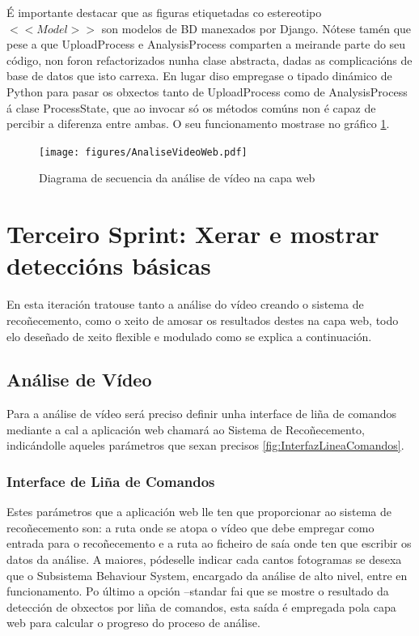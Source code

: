         É importante destacar que as figuras etiquetadas co estereotipo $<<Model>>$ son modelos 
        de BD manexados por Django. Nótese tamén que pese a que UploadProcess e AnalysisProcess
        comparten a meirande parte do seu código, non foron refactorizados nunha clase abstracta,
        dadas as complicacións de base de datos que isto carrexa. En lugar diso empregase o 
        tipado dinámico de Python para pasar os obxectos tanto de UploadProcess como de 
        AnalysisProcess á clase ProcessState, que ao invocar só os métodos comúns non é capaz de 
        percibir a diferenza entre ambas. O seu funcionamento mostrase no gráfico
        \ref{fig:AnaliseVideoWeb}.
        
        \begin{figure}[htp]
        \begin{center}
            \texttt{[image: figures/AnaliseVideoWeb.pdf]}
            \caption{Diagrama de secuencia da análise de vídeo na capa web}
        \label{fig:AnaliseVideoWeb}
        \end{center}
        \end{figure}
    
\section{Terceiro Sprint: Xerar e mostrar deteccións básicas}

    En esta iteración tratouse tanto a análise do vídeo creando o sistema de recoñecemento, como 
    o xeito de amosar os resultados destes na capa web, todo elo deseñado de xeito flexible e 
    modulado como se explica a continuación.
    
    \subsection{Análise de Vídeo}
        Para a análise de vídeo será preciso definir unha interface de liña de comandos mediante
        a cal a aplicación web chamará ao Sistema de Recoñecemento, indicándolle aqueles parámetros
        que sexan precisos \ref{fig:InterfazLineaComandos}.

        \subsubsection{Interface de Liña de Comandos}
        Estes parámetros que a aplicación web lle ten que proporcionar ao sistema de recoñecemento 
        son: a ruta onde se atopa o vídeo que debe empregar como entrada para o recoñecemento e a
        ruta ao ficheiro de saía onde ten que escribir os datos da análise. A maiores, pódeselle
        indicar cada cantos fotogramas se desexa que o Subsistema Behaviour System, encargado da análise de
        alto nivel, entre en funcionamento. Po último a opción --standar fai que se mostre o resultado da
        detección de obxectos por liña de comandos, esta saída é empregada pola capa web para calcular o
        progreso do proceso de análise.\\
        
